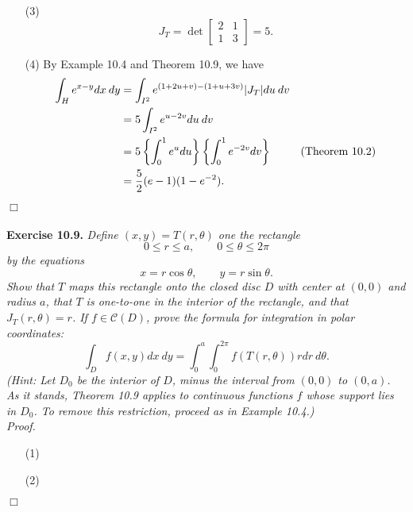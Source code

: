 \documentclass{article}
\begin{document}
\begin{enumerate}
\item[(3)]
  \[
    J_T
    =
    \det\begin{bmatrix}
      2 & 1 \\
      1 & 3
    \end{bmatrix}
    = 5.
  \]

\item[(4)]
  By Example 10.4 and Theorem 10.9, we have
  \begin{align*}
    \int_{H} e^{x-y} dx \: dy
    &= \int_{I^2} e^{(1+2u+v)-(1+u+3v)} \abs{J_T} du \: dv \\
    &= 5 \int_{I^2} e^{u-2v} du \: dv \\
    &= 5 \left\{ \int_{0}^{1} e^u du \right\}\left\{ \int_{0}^{1} e^{-2v} dv \right\}
      &(\text{Theorem 10.2}) \\
    &= \frac{5}{2}(e-1)(1-e^{-2}).
  \end{align*}
\end{enumerate}
$\Box$ \\\\






\textbf{Exercise 10.9.}
\emph{Define $(x,y) = T(r,\theta)$ one the rectangle
\[
  0 \leq r \leq a,
  \qquad
  0 \leq \theta \leq 2\pi
\]
by the equations
\[
  x = r \cos\theta,
  \qquad
  y = r \sin\theta.
\]
Show that $T$ maps this rectangle onto the closed disc $D$ with center at $(0,0)$ and radius $a$,
that $T$ is one-to-one in the interior of the rectangle,
and that $J_T(r,\theta) = r$.
If $f \in \mathscr{C}(D)$, prove the formula for integration in polar coordinates:
\[
  \int_{D} f(x,y)dx \: dy
  = \int_{0}^{a} \int_{0}^{2\pi} f(T(r,\theta))r dr \: d\theta.
\]
(Hint: Let $D_0$ be the interior of $D$,
minus the interval from $(0,0)$ to $(0,a)$.
As it stands, Theorem 10.9 applies to continuous functions $f$
whose support lies in $D_0$.
To remove this restriction,
proceed as in Example 10.4.)} \\

\emph{Proof.}
\begin{enumerate}
\item[(1)]
\item[(2)]

\end{enumerate}
$\Box$ \\\\
\end{document}
